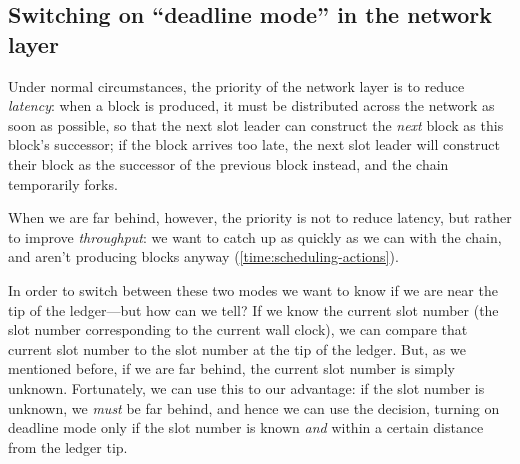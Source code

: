 \subsection{Switching on ``deadline mode'' in the network layer}

Under normal circumstances, the priority of the network layer is to reduce
\emph{latency}: when a block is produced, it must be distributed across the
network as soon as possible, so that the next slot leader can construct the
\emph{next} block as this block's successor; if the block arrives too late,
the next slot leader will construct their block as the successor of the previous
block instead, and the chain temporarily forks.

When we are far behind, however, the priority is not to reduce latency, but
rather to improve \emph{throughput}: we want to catch up as quickly as we can
with the chain, and aren't producing blocks anyway
(\cref{time:scheduling-actions}).

In order to switch between these two modes we want to know if we are near the
tip of the ledger---but how can we tell? If we know the current slot number
(the slot number corresponding to the current wall clock), we can compare
that current slot number to the slot number at the tip of the ledger. But,
as we mentioned before, if we are far behind, the current slot number is
simply unknown. Fortunately, we can use this to our advantage: if the
slot number is unknown, we \emph{must} be far behind, and hence we can use
the decision, turning on deadline mode only if the slot number is known
\emph{and} within a certain distance from the ledger tip.
